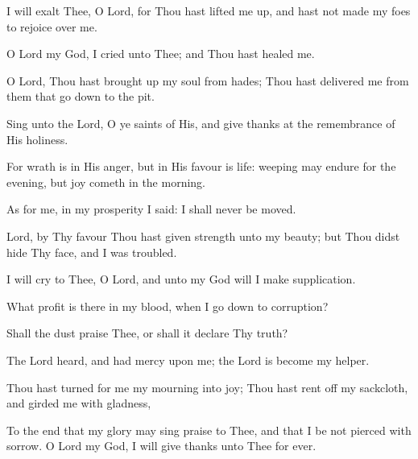 I will exalt Thee, O Lord, for Thou hast lifted me up, and hast not made my foes to rejoice over me.

O Lord my God, I cried unto Thee; and Thou hast healed me.

O Lord, Thou hast brought up my soul from hades; Thou hast delivered me from them that go down to the pit.

Sing unto the Lord, O ye saints of His, and give thanks at the remembrance of His holiness.

For wrath is in His anger, but in His favour is life: weeping may endure for the evening, but joy cometh in the morning.

As for me, in my prosperity I said: I shall never be moved.

Lord, by Thy favour Thou hast given strength unto my beauty; but Thou didst hide Thy face, and I was troubled.

I will cry to Thee, O Lord, and unto my God will I make supplication.

What profit is there in my blood, when I go down to corruption?

Shall the dust praise Thee, or shall it declare Thy truth?

The Lord heard, and had mercy upon me; the Lord is become my helper.

Thou hast turned for me my mourning into joy; Thou hast rent off my sackcloth, and girded me with gladness,

To the end that my glory may sing praise to Thee, and that I be not pierced with sorrow. O Lord my God, I will give thanks unto Thee for ever.
